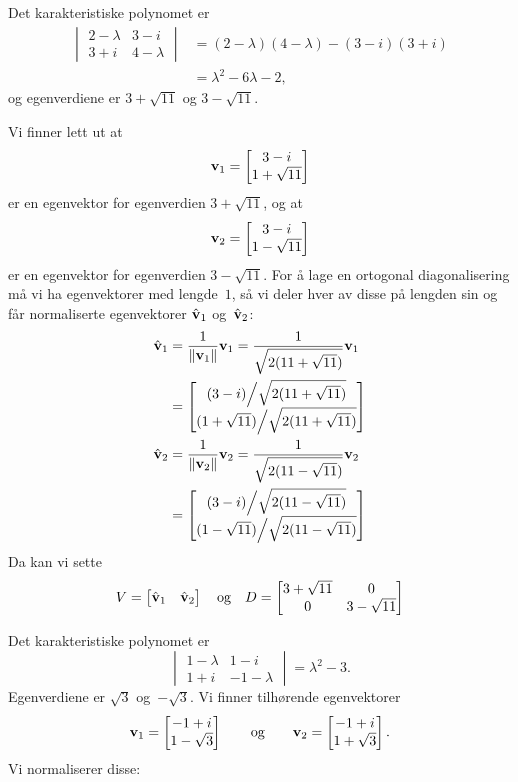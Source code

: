 \begin{losning}
\begin{punkt}
Det karakteristiske polynomet er
\begin{align*}
\begin{vmatrix}
2 - \lambda & 3 - i       \\
3 + i       & 4 - \lambda
\end{vmatrix}
&= (2 - \lambda)(4 - \lambda) - (3 - i)(3 + i) \\
&= \lambda^2 - 6\lambda - 2,
\end{align*}
og egenverdiene er $3 + \sqrt{11}$ og $3 - \sqrt{11}$.

Vi finner lett ut at
\[
\mathbf{v}_1 = \begin{bmatrix} 3-i \\ 1+\sqrt{11} \end{bmatrix}
\]
er en egenvektor for egenverdien $3 + \sqrt{11}$, og at
\[
\mathbf{v}_2 = \begin{bmatrix} 3-i \\ 1-\sqrt{11} \end{bmatrix}
\]
er en egenvektor for egenverdien $3 - \sqrt{11}$.  For å lage en
ortogonal diagonalisering må vi ha egenvektorer med lengde~$1$, så vi
deler hver av disse på lengden sin og får normaliserte egenvektorer
$\hat{\mathbf{v}}_1$ og~$\hat{\mathbf{v}}_2$:
\begin{align*}
\hat{\mathbf{v}}_1
&= \frac{1}{\| \mathbf{v}_1 \|} \mathbf{v}_1
 = \frac{1}{\sqrt{2 (11+\sqrt{11})}} \mathbf{v}_1 \\
&= \begin{bmatrix} (3-i) \Big/ \sqrt{2 (11+\sqrt{11})} \\ (1+\sqrt{11}) \Big/ \sqrt{2 (11+\sqrt{11})} \end{bmatrix}
\\
\hat{\mathbf{v}}_2
&= \frac{1}{\| \mathbf{v}_2 \|} \mathbf{v}_2
 = \frac{1}{\sqrt{2 (11-\sqrt{11})}} \mathbf{v}_2 \\
&= \begin{bmatrix} (3-i) \Big/ \sqrt{2 (11-\sqrt{11})} \\ (1-\sqrt{11}) \Big/ \sqrt{2 (11-\sqrt{11})} \end{bmatrix}
\end{align*}
Da kan vi sette
\[
V = \begin{bmatrix} \hat{\mathbf{v}}_1 & \hat{\mathbf{v}}_2 \end{bmatrix}
\quad\text{og}\quad
D =
\begin{bmatrix}
3+\sqrt{11} & 0           \\
0           & 3-\sqrt{11}
\end{bmatrix}
\]
\end{punkt}
\begin{punkt}
Det karakteristiske polynomet er
\[
\begin{vmatrix}
1-\lambda & 1-i\\
1+i & -1-\lambda
\end{vmatrix}
= \lambda^2 - 3.
\]
Egenverdiene er $\sqrt{3}$ og~$-\sqrt{3}$.  Vi finner tilhørende
egenvektorer
\[
\mathbf{v}_1 = \begin{bmatrix} -1+i \\ 1-\sqrt{3} \end{bmatrix}
\qquad\text{og}\qquad
\mathbf{v}_2 = \begin{bmatrix} -1+i \\ 1+\sqrt{3} \end{bmatrix}.
\]
Vi normaliserer disse:
\begin{align*}

\end{align*}
\end{punkt}
\end{losning}
